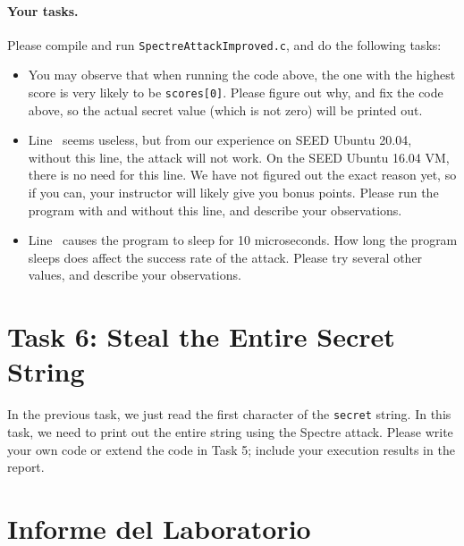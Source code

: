 \paragraph{Your tasks.} Please compile and run \texttt{SpectreAttackImproved.c},
and do the following tasks:

\begin{itemize}
  \item You may observe that when running the code above, 
        the one with the highest score is very likely to be 
        \texttt{scores[0]}. Please figure out why, and fix the code above,
        so the actual secret value (which is not zero) will be printed out. 
	
  \item Line~ seems useless, but from our experience on SEED Ubuntu 20.04, without this line,
        the attack will not work. On the SEED Ubuntu 16.04 VM, there is no need for this line. 
	We have not figured out the exact reason yet, so if you can, your instructor will
	likely give you bonus points. 
	Please run the program with and without this line, and describe your observations. 

  \item Line~ causes the program to sleep for 10 microseconds. How long the program
        sleeps does affect the success rate of the attack. Please try several other values,
	and describe your observations. 
\end{itemize}
 



\section{Task 6: Steal the Entire Secret String}

In the previous task, we  just read the first character of the \texttt{secret}
string. In this task, we need to print out the entire string using the 
Spectre attack. Please write your own code or extend the code in Task 5; include your
execution results in the report.


\section{Informe del Laboratorio}

